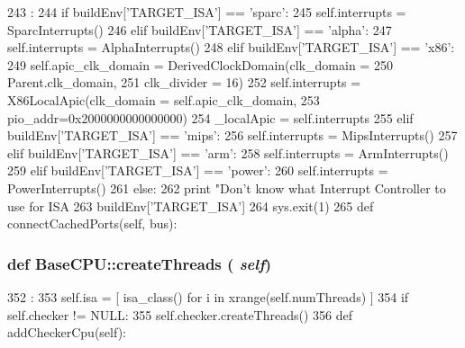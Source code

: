 \begin{DoxyCode}
243                                        :
244         if buildEnv['TARGET_ISA'] == 'sparc':
245             self.interrupts = SparcInterrupts()
246         elif buildEnv['TARGET_ISA'] == 'alpha':
247             self.interrupts = AlphaInterrupts()
248         elif buildEnv['TARGET_ISA'] == 'x86':
249             self.apic_clk_domain = DerivedClockDomain(clk_domain =
250                                                       Parent.clk_domain,
251                                                       clk_divider = 16)
252             self.interrupts = X86LocalApic(clk_domain = self.apic_clk_domain,
253                                            pio_addr=0x2000000000000000)
254             _localApic = self.interrupts
255         elif buildEnv['TARGET_ISA'] == 'mips':
256             self.interrupts = MipsInterrupts()
257         elif buildEnv['TARGET_ISA'] == 'arm':
258             self.interrupts = ArmInterrupts()
259         elif buildEnv['TARGET_ISA'] == 'power':
260             self.interrupts = PowerInterrupts()
261         else:
262             print "Don't know what Interrupt Controller to use for ISA %
263                 buildEnv['TARGET_ISA']
264             sys.exit(1)
265 
    def connectCachedPorts(self, bus):
\end{DoxyCode}
\hypertarget{namespaceBaseCPU_a777d9a4ff3af90a6d70daf01dc86fa6b}{
\subsubsection[{createThreads}]{\setlength{\rightskip}{0pt plus 5cm}def BaseCPU::createThreads ( {\em self})}}
\label{namespaceBaseCPU_a777d9a4ff3af90a6d70daf01dc86fa6b}



\begin{DoxyCode}
352                            :
353         self.isa = [ isa_class() for i in xrange(self.numThreads) ]
354         if self.checker != NULL:
355             self.checker.createThreads()
356 
    def addCheckerCpu(self):
\end{DoxyCode}
